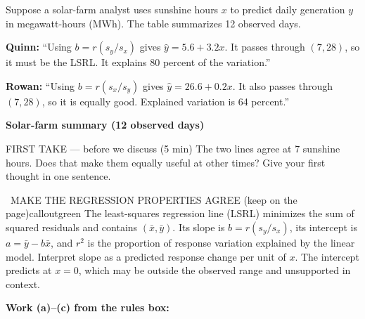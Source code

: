 \documentclass[11pt]{article}
\begin{document}


Suppose a solar-farm analyst uses sunshine hours $x$ to predict daily generation $y$ in megawatt-hours (MWh). The table summarizes 12 observed days.\par\smallskip \textbf{Quinn:} ``Using $b=r(s_y/s_x)$ gives $\hat y=5.6+3.2x$. It passes through $(7,28)$, so it must be the LSRL. It explains 80 percent of the variation.''\par \textbf{Rowan:} ``Using $b=r(s_x/s_y)$ gives $\hat y=26.6+0.2x$. It also passes through $(7,28)$, so it is equally good. Explained variation is 64 percent.''\par
\begin{center}
\textbf{Solar-farm summary (12 observed days)}\par\smallskip
{}
\end{center}
\begin{firsttakebox}{FIRST TAKE --- before we discuss (5 min)}
The two lines agree at 7 sunshine hours. Does that make them equally useful at other times? Give your first thought in one sentence.
\workspace{0.65in}
\end{firsttakebox}

\begin{callout}{\IconBook\ MAKE THE REGRESSION PROPERTIES AGREE (keep on the page)}{calloutgreen}
The least-squares regression line (LSRL) minimizes the sum of squared residuals and contains
$(\bar x,\bar y)$. Its slope is $b=r(s_y/s_x)$, its intercept is
$a=\bar y-b\bar x$, and $r^2$ is the proportion of response variation explained by the
linear model. Interpret slope as a predicted response change per unit of $x$. The intercept
predicts at $x=0$, which may be outside the observed range and unsupported in context.
\end{callout}

\newpage
\textbf{Work (a)--(c) from the rules box:}\par\smallskip
\end{document}
